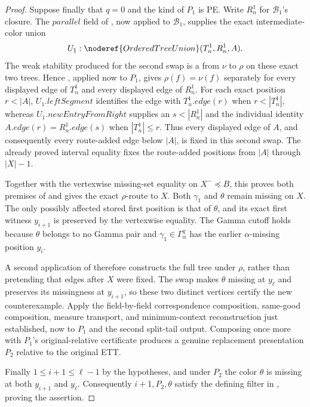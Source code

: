 \begin{proof}
Suppose finally that \(q=0\) and the kind of \(P_1\) is PE.  Write
\(R_n^1\) for \(\mathcal B_1\)'s closure.  The
\(\mathit{parallel}\) field of , now applied to
\(\mathcal B_1\), supplies the exact intermediate-color union
\[
 U_1:\noderef{OrderedTreeUnion}(T_n^1,R_n^1,A).
\]
The weak stability produced for the second swap is a
 from \(\nu\) to \(\rho\) on these exact
two trees.  Hence , applied now
to \(P_1\), gives \(\rho(f)=\nu(f)\) separately for every displayed
edge of \(T_n^1\) and every displayed edge of \(R_n^1\).  For each exact
position \(r<|A|\), \(U_1.\mathit{leftSegment}\) identifies the edge
with \(T_n^1.\mathit{edge}(r)\) when \(r<|T_n^1|\), whereas
\(U_1.\mathit{newEntryFromRight}\) supplies an \(s<|R_n^1|\) and the
individual identity
\(A.\mathit{edge}(r)=R_n^1.\mathit{edge}(s)\) when
\(|T_n^1|\le r\).  Thus every displayed edge of \(A\), and consequently
every route-added edge below \(|A|\), is fixed in this second swap.  The
already proved interval equality fixes the route-added positions from
\(|A|\) through \(|X|-1\).

Together with the vertexwise missing-set equality on
\(X^-\preccurlyeq B\), this proves both premises of
 and gives the
exact \(\rho\)-route to \(X\).  Both \(\gamma_1\) and \(\theta\) remain
missing on \(X\).  The only possibly affected stored first position is that of
\(\theta\), and its exact first witness \(y_{i+1}\) is preserved by the
vertexwise equality.  The Gamma cutoff holds because \(\theta\) belongs
to no Gamma pair and \(\gamma_1\in\Gamma^q_\alpha\) has the earlier
\(\alpha\)-missing position \(y_i\).

A second application of
 therefore constructs the full
tree under \(\rho\), rather than pretending that edges after \(X\) were
fixed.  The swap makes \(\theta\) missing at \(y_\ell\) and preserves its
missingness at \(y_{i+1}\), so these two distinct vertices certify the
new counterexample.  Apply the field-by-field correspondence composition,
same-good composition, measure transport, and minimum-context
reconstruction just established, now to \(P_1\) and the second split-tail
output.  Composing once more with \(P_1\)'s original-relative certificate
produces a genuine replacement presentation \(P_2\) relative to the
original ETT.

Finally \(1\le i+1\le\ell-1\) by the hypotheses, and under \(P_2\) the
color \(\theta\) is missing at both \(y_{i+1}\) and \(y_\ell\).
Consequently \(i+1,P_2,\theta\) satisfy the defining filter in
, proving the assertion.
\end{proof}
